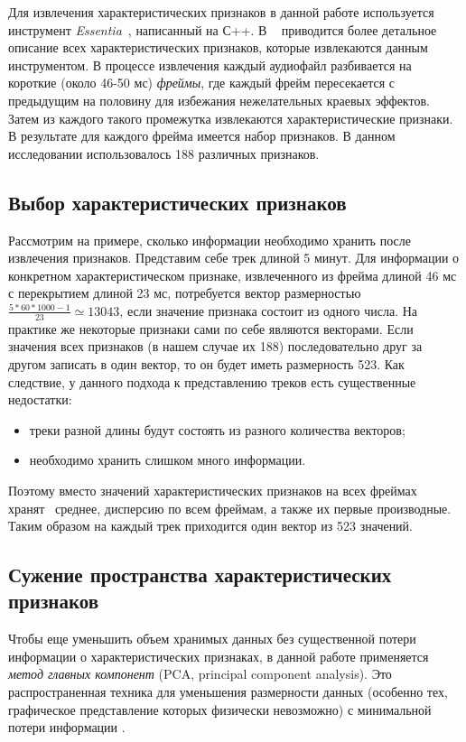 Для извлечения характеристических признаков в данной работе используется инструмент \emph{Essentia}~\cite{essentia}, написанный на С++. 
В ~\cite{essentia} приводится более детальное описание всех характеристических признаков, которые извлекаются данным инструментом. 
В процессе извлечения каждый аудиофайл разбивается на короткие (около 46-50 мс) \emph{фреймы}, где каждый фрейм пересекается с предыдущим 
на половину для избежания нежелательных краевых эффектов.
Затем из каждого такого промежутка извлекаются характеристические признаки. В результате для каждого фрейма имеется набор признаков.
В данном исследовании использовалось 188 различных признаков.

\subsection{Выбор характеристических признаков}

Рассмотрим на примере, сколько информации необходимо хранить после извлечения признаков.
Представим себе трек длиной 5 минут. Для информации о конкретном характеристическом признаке, извлеченного из фрейма длиной 46 мс с перекрытием длиной
23 мс, потребуется вектор размерностью $\frac{5 * 60 * 1000 - 1}{23} \simeq 13043$, если значение признака состоит из одного числа. На практике
же некоторые признаки сами по себе являются векторами. Если значения всех признаков (в нашем случае их 188) последовательно друг за другом 
записать в один вектор, то он будет иметь размерность 523.
Как следствие, у данного подхода к представлению треков есть существенные недостатки:
\begin{itemize}
 \item треки разной длины будут состоять из разного количества векторов;
 \item необходимо хранить слишком много информации.
\end{itemize}
Поэтому вместо значений характеристических признаков на всех фреймах хранят~\cite{msordo_thesis, essentia} среднее, дисперсию по всем фреймам, а также их первые производные.
Таким образом на каждый трек приходится один вектор из 523 значений.

\subsection{Сужение пространства характеристических признаков}

Чтобы еще уменьшить объем хранимых данных без существенной потери информации о характеристических признаках, в данной работе применяется \emph{метод главных компонент} (PCA, principal component analysis).
Это распространенная техника для уменьшения размерности данных (особенно тех, графическое представление которых физически невозможно) с минимальной потери информации \cite{msordo_thesis, pca}. 

